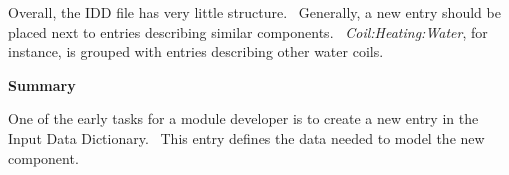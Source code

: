 Overall, the IDD file has very little structure.~ Generally, a new entry should be placed next to entries describing similar components.~ \emph{Coil:Heating:Water}, for instance, is grouped with entries describing other water coils.

\textbf{Summary}

One of the early tasks for a module developer is to create a new entry in the Input Data Dictionary.~ This entry defines the data needed to model the new component.
